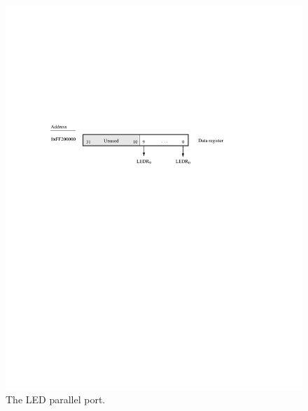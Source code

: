\documentclass[11pt, twoside, pdftex]{article}
\begin{document}
\begin{figure}[H]
   \begin{center}
       \includegraphics{figures/fig_LED_port.pdf}
   \end{center}
   \caption{The LED parallel port.}
	\label{fig:LED}
\end{figure}
\end{document}
